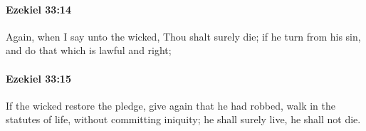 		\paragraph{Ezekiel 33:14} %
			\label{EZEKIEL-33-14}

			Again, when I say unto the wicked, Thou shalt surely die; if he turn from his sin, and do that which is lawful and right;


		\paragraph{Ezekiel 33:15} %
			\label{EZEKIEL-33-15}

			If the wicked restore the pledge, give again that he had robbed, walk in the statutes of life, without committing iniquity; he shall surely live, he shall not die.


